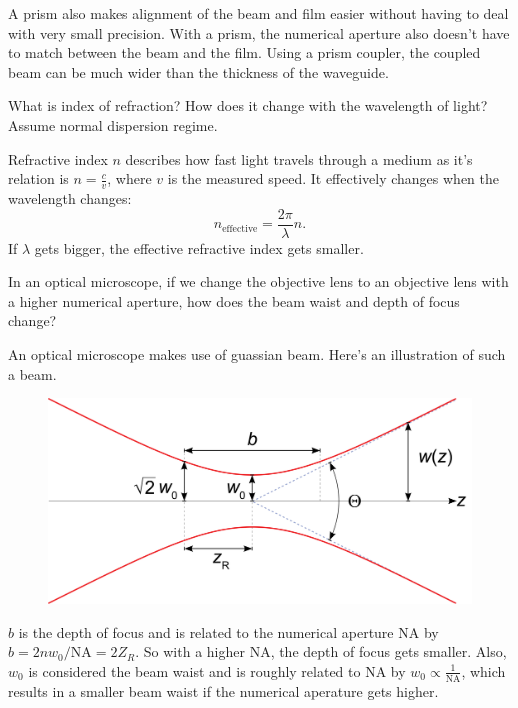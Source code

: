 \documentclass[answers, addpoints]{exam} %
\begin{document}
\begin{questions}
\begin{solution}
		A prism also makes alignment of the beam and film easier without having to deal with very small precision.
		With a prism, the numerical aperture also doesn't have to match between the beam and the film.
		Using a prism coupler, the coupled beam can be much wider than the thickness of the waveguide.
	\end{solution}

	\question[5] What is index of refraction? How does it change with the wavelength of light? Assume normal dispersion regime.
	\begin{solution}
		Refractive index $n$ describes how fast light travels through a medium as it's relation is $n = \frac{c}{v}$, where $v$ is the measured speed.
		It effectively changes when the wavelength changes:
		\begin{displaymath}
		n_{\mathrm{effective}} = \frac{2\pi}{\lambda} n.
		\end{displaymath}
		If $\lambda$ gets bigger, the effective refractive index gets smaller.
	\end{solution}
	
	\question[5] In an optical microscope, if we change the objective lens to an objective lens with a higher numerical aperture, how does the beam waist and depth of focus change?
	\begin{solution}
		An optical microscope makes use of guassian beam.
		Here's an illustration of such a beam.
		\begin{figure}[H]
			\centering
			\includegraphics[scale=.1]{figures/gaussian}
		\end{figure}
		$b$ is the depth of focus and is related to the numerical aperture $\mathrm{NA}$ by $b=2 n w_0 / \mathrm{NA} = 2 Z_R$.
		So with a higher $\mathrm{NA}$, the depth of focus gets smaller.
		Also, $w_0$ is considered the beam waist and is roughly related to $\mathrm{NA}$ by $w_0 \propto \frac{1}{\mathrm{NA}}$, which results in a smaller beam waist if the numerical aperature gets higher.
	\end{solution}
		

\end{questions}
\end{document}
